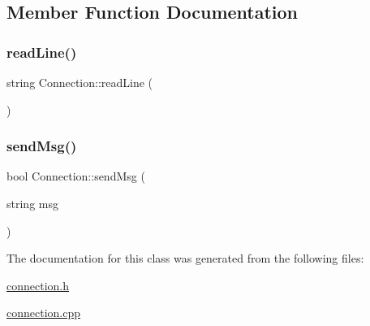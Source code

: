 \subsection{Member Function Documentation}
\hypertarget{class_connection_a1df16b436751b686d96c24ca0c498659}{}\label{class_connection_a1df16b436751b686d96c24ca0c498659} 
\subsubsection{\texorpdfstring{read\+Line()}{readLine()}}
{\footnotesize\ttfamily string Connection\+::read\+Line (\begin{DoxyParamCaption}{ }\end{DoxyParamCaption})}

\hypertarget{class_connection_a4b9f6db1fb42fc9857f829fa0bc52e6e}{}\label{class_connection_a4b9f6db1fb42fc9857f829fa0bc52e6e} 
\subsubsection{\texorpdfstring{send\+Msg()}{sendMsg()}}
{\footnotesize\ttfamily bool Connection\+::send\+Msg (\begin{DoxyParamCaption}\item[{string}]{msg }\end{DoxyParamCaption})}



The documentation for this class was generated from the following files\+:\begin{DoxyCompactItemize}
\item 
\hyperlink{connection_8h}{connection.\+h}\item 
\hyperlink{connection_8cpp}{connection.\+cpp}\end{DoxyCompactItemize}
